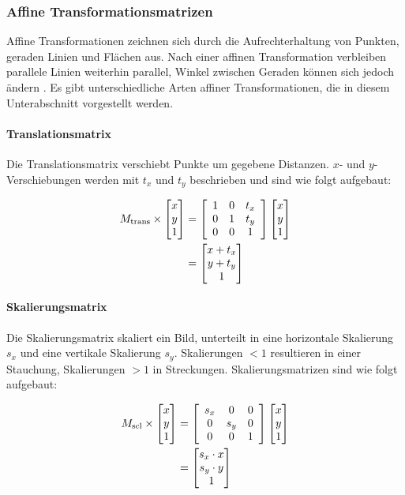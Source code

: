 \vfill
\newpage
\subsubsection{Affine Transformationsmatrizen}
\label{sec:affine_transformations_matrizen}

Affine Transformationen zeichnen sich durch die Aufrechterhaltung von Punkten, geraden Linien und Flächen aus. Nach einer affinen Transformation verbleiben parallele Linien weiterhin parallel, Winkel zwischen Geraden können sich jedoch ändern \cite{cv_general}. Es gibt unterschiedliche Arten affiner Transformationen, die in diesem Unterabschnitt vorgestellt werden.

\paragraph{Translationsmatrix}
\label{par:translation}

Die Translationsmatrix verschiebt Punkte um gegebene Distanzen. $x$- und $y$-Verschiebungen werden mit $t_x$ und $t_y$ beschrieben und sind wie folgt aufgebaut:

{\setlength{\belowdisplayskip}{0.5ex}
\begin{align*}
    M_\text{trans} \times \begin{bmatrix} x \\ y \\ 1 \end{bmatrix}
     & =
    \left[
        \begin{array}{ccc}
            1 & 0 & t_x \\
            0 & 1 & t_y \\
            0 & 0 & 1   \\
        \end{array}
        \right]
    \begin{bmatrix} x \\ y \\ 1 \end{bmatrix} \\
     & =
    \begin{bmatrix} x + t_x \\ y + t_y \\ 1 \end{bmatrix}
\end{align*}}

\paragraph{Skalierungsmatrix}
\label{par:skalierung}

Die Skalierungsmatrix skaliert ein Bild, unterteilt in eine horizontale Skalierung $s_x$ und eine vertikale Skalierung $s_y$. Skalierungen $<1$ resultieren in einer Stauchung, Skalierungen $>1$ in Streckungen. Skalierungsmatrizen sind wie folgt aufgebaut:

{\setlength{\belowdisplayskip}{0.5ex}
\begin{align*}
    M_\text{scl} \times \begin{bmatrix} x \\ y \\ 1 \end{bmatrix}
     & =
    \left[
        \begin{array}{ccc}
            s_x & 0   & 0 \\
            0   & s_y & 0 \\
            0   & 0   & 1 \\
        \end{array}
        \right]
    \begin{bmatrix} x \\ y \\ 1 \end{bmatrix} \\
     & =
    \begin{bmatrix} s_x \cdot x \\ s_y \cdot y \\ 1 \end{bmatrix}
\end{align*}}

